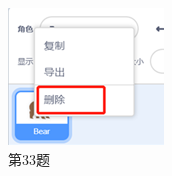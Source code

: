 \documentclass[10pt, a4paper]{article}
\begin{document}
\begin{figure}[htbp]
\begin{minipage}[t]{.13\textwidth}
            \includegraphics[width=\textwidth]{33.png}
            \caption*{第33题}
        \end{minipage}
    \end{figure}
\end{document}
